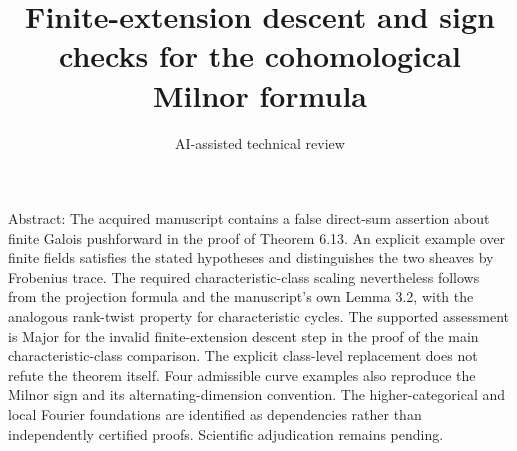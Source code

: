\documentclass[10pt]{article}
\title{Finite-extension descent and sign checks for the cohomological Milnor formula}
\author{AI-assisted technical review}
\date{}
\begin{document}
\maketitle
Abstract: The acquired manuscript contains a false direct-sum assertion about finite Galois pushforward in the proof of Theorem 6.13. An explicit example over finite fields satisfies the stated hypotheses and distinguishes the two sheaves by Frobenius trace. The required characteristic-class scaling nevertheless follows from the projection formula and the manuscript’s own Lemma 3.2, with the analogous rank-twist property for characteristic cycles. The supported assessment is Major for the invalid finite-extension descent step in the proof of the main characteristic-class comparison. The explicit class-level replacement does not refute the theorem itself. Four admissible curve examples also reproduce the Milnor sign and its alternating-dimension convention. The higher-categorical and local Fourier foundations are identified as dependencies rather than independently certified proofs. Scientific adjudication remains pending.\par
\end{document}
